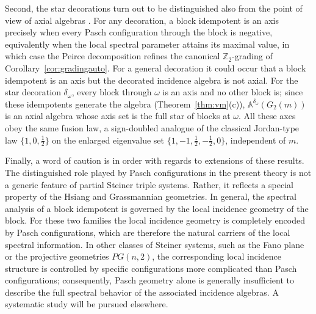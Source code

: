 \documentclass[times,11pt,reqno]{amsproc}
\theoremstyle{definition}
\numberwithin{equation}{section}
\def\alg{\mathbb{A}}
\begin{document}
Second, the star decorations turn out to be distinguished also from the point of view of axial algebras \cite{Khasraw-McInroy-Shpectorov}. For any decoration, a block idempotent is an axis precisely when every Pasch configuration through the block is negative, equivalently when the local spectral parameter attains its maximal value, in which case the Peirce decomposition refines the canonical $\mathbb Z_2$-grading of
Corollary~\ref{cor:gradingauto}. For a general decoration it could occur that a block idempotent is an axis but the decorated incidence algebra is not axial.
For the star decoration $\delta_\omega$, every block through $\omega$ is an axis and no other block is; since these idempotents generate the algebra (Theorem~\ref{thm:vm}(c)), $\alg^{\delta_\omega}(G_2(m))$ is an axial algebra whose axis set is the full star of blocks at $\omega$. All these axes obey the same fusion law, a sign-doubled analogue of the classical Jordan-type law $\{1,0,\tfrac12\}$ on the enlarged eigenvalue set
$\{1,-1,\tfrac12,-\tfrac12,0\}$, independent of $m$.

Finally, a word of caution is in order with regards to extensions of these results. The distinguished role played by Pasch configurations in the present theory is not a generic feature of partial Steiner triple systems. Rather, it reflects a special property of the Hsiang and Grassmannian geometries. In general, the spectral analysis of a block idempotent is governed by the local incidence geometry of the block.
For these two families the local incidence geometry is completely encoded by Pasch configurations, which are therefore the natural carriers of the local spectral information. In other classes of Steiner systems, such as the Fano plane or the projective geometries $PG(n,2)$, the corresponding local incidence structure is controlled by specific configurations more complicated than Pasch configurations; consequently, Pasch geometry alone is generally insufficient to describe the full spectral behavior of the associated incidence algebras. A systematic study will be pursued elsewhere.
\end{document}
